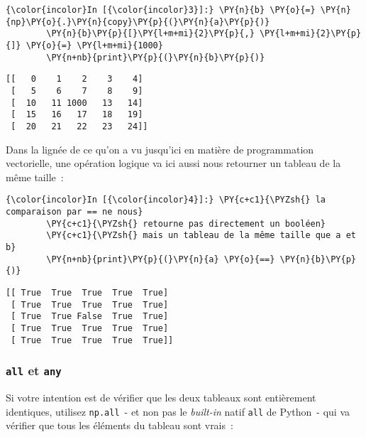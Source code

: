     \begin{Verbatim}[commandchars=\\\{\}]
{\color{incolor}In [{\color{incolor}3}]:} \PY{n}{b} \PY{o}{=} \PY{n}{np}\PY{o}{.}\PY{n}{copy}\PY{p}{(}\PY{n}{a}\PY{p}{)}
        \PY{n}{b}\PY{p}{[}\PY{l+m+mi}{2}\PY{p}{,} \PY{l+m+mi}{2}\PY{p}{]} \PY{o}{=} \PY{l+m+mi}{1000}
        \PY{n+nb}{print}\PY{p}{(}\PY{n}{b}\PY{p}{)}
\end{Verbatim}


    \begin{Verbatim}[commandchars=\\\{\}]
[[   0    1    2    3    4]
 [   5    6    7    8    9]
 [  10   11 1000   13   14]
 [  15   16   17   18   19]
 [  20   21   22   23   24]]

    \end{Verbatim}

    Dans la lignée de ce qu'on a vu jusqu'ici en matière de programmation
vectorielle, une opération logique va ici aussi nous retourner un
tableau de la même taille~:

    \begin{Verbatim}[commandchars=\\\{\}]
{\color{incolor}In [{\color{incolor}4}]:} \PY{c+c1}{\PYZsh{} la comparaison par == ne nous}
        \PY{c+c1}{\PYZsh{} retourne pas directement un booléen}
        \PY{c+c1}{\PYZsh{} mais un tableau de la même taille que a et b}
        \PY{n+nb}{print}\PY{p}{(}\PY{n}{a} \PY{o}{==} \PY{n}{b}\PY{p}{)}
\end{Verbatim}


    \begin{Verbatim}[commandchars=\\\{\}]
[[ True  True  True  True  True]
 [ True  True  True  True  True]
 [ True  True False  True  True]
 [ True  True  True  True  True]
 [ True  True  True  True  True]]

    \end{Verbatim}

    \hypertarget{all-et-any}{%
\subsubsection{\texorpdfstring{\texttt{all} et
\texttt{any}}{all et any}}\label{all-et-any}}

    Si votre intention est de vérifier que les deux tableaux sont
entièrement identiques, utilisez \texttt{np.all}~- et non pas le
\emph{built-in} natif \texttt{all} de Python~- qui va vérifier que tous
les éléments du tableau sont vrais~:

